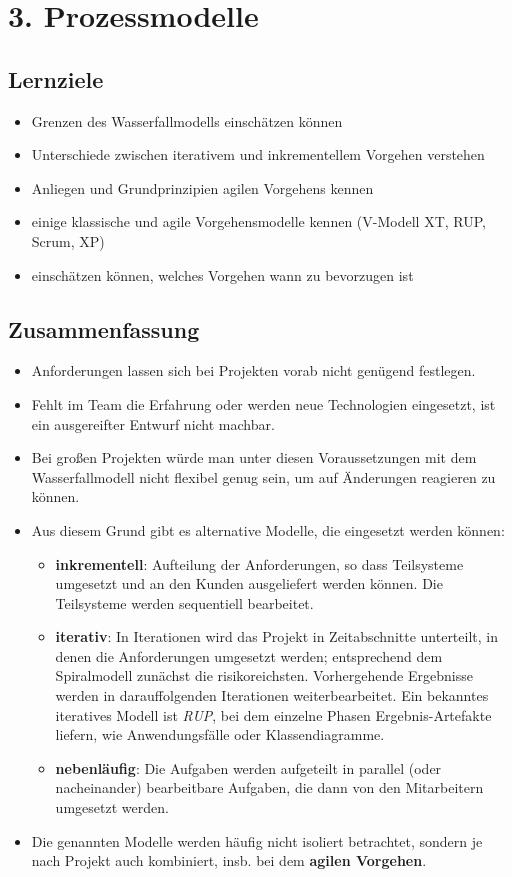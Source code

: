 \section*{3. Prozessmodelle}

\subsection*{Lernziele}
\begin{itemize}
    \item Grenzen des Wasserfallmodells einschätzen können
    \item Unterschiede zwischen iterativem und inkrementellem Vorgehen verstehen
    \item Anliegen und Grundprinzipien agilen Vorgehens kennen
    \item einige klassische und agile Vorgehensmodelle kennen (V-Modell XT, RUP, Scrum, XP)
    \item einschätzen können, welches Vorgehen wann zu bevorzugen ist
\end{itemize}

\subsection*{Zusammenfassung}

\begin{itemize}
    \item Anforderungen lassen sich bei Projekten vorab nicht genügend festlegen.
    \item Fehlt im Team die Erfahrung oder werden neue Technologien eingesetzt, ist ein ausgereifter Entwurf nicht machbar.
    \item Bei großen Projekten würde man unter diesen Voraussetzungen mit dem Wasserfallmodell nicht flexibel genug sein,
    um auf Änderungen reagieren zu können.
    \item Aus diesem Grund gibt es alternative Modelle, die eingesetzt werden können:
    \begin{itemize}
        \item \textbf{inkrementell}: Aufteilung der Anforderungen, so dass Teilsysteme umgesetzt und an den Kunden ausgeliefert werden können.
        Die Teilsysteme werden sequentiell bearbeitet.
        \item \textbf{iterativ}: In Iterationen wird das Projekt in Zeitabschnitte unterteilt, in denen die Anforderungen umgesetzt werden; entsprechend dem Spiralmodell zunächst die risikoreichsten.
        Vorhergehende Ergebnisse werden in darauffolgenden Iterationen weiterbearbeitet.
        Ein bekanntes iteratives Modell ist \textit{RUP}, bei dem einzelne Phasen Ergebnis-Artefakte liefern, wie Anwendungsfälle oder Klassendiagramme.
        \item \textbf{nebenläufig}: Die Aufgaben werden aufgeteilt in parallel (oder nacheinander) bearbeitbare Aufgaben, die dann von den Mitarbeitern umgesetzt werden.
    \end{itemize}
    \item Die genannten Modelle werden häufig nicht isoliert betrachtet, sondern je nach Projekt auch kombiniert, insb. bei dem \textbf{agilen Vorgehen}.
\end{itemize}

